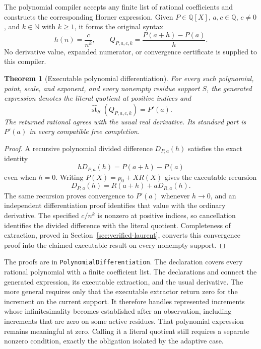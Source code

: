 \documentclass[11pt,a4paper]{article}
\theoremstyle{result}
\newtheorem{theorem}{Theorem}
\theoremstyle{definition}
\newcommand{\N}{\mathbb{N}}
\newcommand{\Q}{\mathbb{Q}}
\newcommand{\st}{\operatorname{st}}
\newcommand{\sthat}{\widehat{\st}}
\newcommand{\code}[1]{\texttt{#1}}
\begin{document}
The polynomial compiler accepts any finite list of rational coefficients and constructs the corresponding Horner expression. Given $P\in\Q[X]$, $a,c\in\Q$, $c\ne0$, and $k\in\N$ with $k\ge1$, it forms the original syntax
\[
  h(n)=\frac{c}{n^k},\qquad
  Q_{P,a,c,k}=\frac{P(a+h)-P(a)}{h}.
\]
No derivative value, expanded numerator, or convergence certificate is supplied to this compiler.

\begin{theorem}[Executable polynomial differentiation]\label{thm:polynomial-derivative}
  For every such polynomial, point, scale, and exponent, and every nonempty residue support $S$, the generated expression denotes the literal quotient at positive indices and
  \[
    \sthat_S(Q_{P,a,c,k})=P'(a).
  \]
  The returned rational agrees with the usual real derivative. Its standard part is $P'(a)$ in every compatible free completion.
\end{theorem}
\begin{proof}
  A recursive polynomial divided difference $D_{P,a}(h)$ satisfies the exact identity
  \[
    hD_{P,a}(h)=P(a+h)-P(a)
  \]
  even when $h=0$. Writing $P(X)=p_0+XR(X)$ gives the executable recursion
  \[
    D_{P,a}(h)=R(a+h)+aD_{R,a}(h).
  \]
  The same recursion proves convergence to $P'(a)$ whenever $h\to0$, and an independent differentiation proof identifies that value with the ordinary derivative. The specified $c/n^k$ is nonzero at positive indices, so cancellation identifies the divided difference with the literal quotient. Completeness of extraction, proved in Section~\ref{sec:verified-laurent}, converts this convergence proof into the claimed executable result on every nonempty support.
\end{proof}

The proofs are in \code{PolynomialDifferentiation}. The declaration  covers every rational polynomial with a finite coefficient list. The declarations  and  connect the generated expression, its executable extraction, and the usual derivative. The more general  requires only that the executable extractor return zero for the increment on the current support. It therefore handles represented increments whose infinitesimality becomes established after an observation, including increments that are zero on some active residues. That polynomial expression remains meaningful at zero. Calling it a literal quotient still requires a separate nonzero condition, exactly the obligation isolated by the adaptive case.
\end{document}
